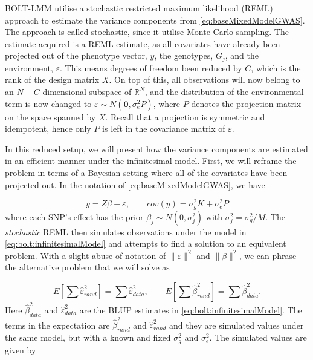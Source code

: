 BOLT-LMM utilise a stochastic restricted maximum likelihood (REML) approach to estimate the variance components from 
\cref{eq:baseMixedModelGWAS}. The approach is called stochastic, since it utilise Monte Carlo sampling. The estimate acquired is a 
REML estimate, as all covariates have already been projected out of the phenotype vector, $ y $, the genotypes, $ G_j $, and the 
environment, $ \varepsilon $. This means degrees of freedom been reduced by $ C $, which is the rank of the design matrix $ X $. On 
top of this, all observations will now belong to an $ N-C $ dimensional subspace of $ \mathbb{R}^{N} $, and the distribution of the 
environmental term is now changed to $ \varepsilon \sim N(\mathbf{0}, \sigma_e^2 P)$, where $ P $ denotes the projection matrix on the 
space spanned by $ X $. Recall that a projection is symmetric and idempotent, hence only $ P $ is left in the covariance matrix of $ 
\varepsilon $. 

In this reduced setup, we will present how the variance components are estimated in an efficient manner under the infinitesimal model. 
First, we will reframe the problem in terms of a Bayesian setting where all of the covariates have been projected out. In the notation 
of \cref{eq:baseMixedModelGWAS}, we have

\begin{equation}\label{eq:bolt:infinitesimalModel}
y = Z\beta + \varepsilon, \qquad cov(y) = \sigma_g^2 K + \sigma_e^2 P
\end{equation}
where each SNP's effect has the prior $ \beta_j \sim N(0, \sigma_j^2)$ with $\sigma_j^2 = \sigma_g^2 / M $. The \textit{stochastic} 
REML then simulates observations under the model in \cref{eq:bolt:infinitesimalModel} and attempts to find a solution to an 
equivalent problem. With a slight abuse of notation of $ \lVert \varepsilon \rVert^2$ and  $ \lVert \beta \rVert^2$, we can phrase the 
alternative problem that we will solve as

\begin{equation} \label{eq:bolt:AlternativeMMEProblem}
E\left[ \sum \hat{\varepsilon}^2_{rand} \right] = \sum \hat{\varepsilon}^2_{data}, \qquad E\left[ \sum \hat{\beta}^2_{rand} \right] = 
\sum \hat{\beta}^2_{data}.
\end{equation}
Here $ \hat{\beta}^2_{data} $ and $ \hat{\varepsilon}^2_{data} $ are the BLUP estimates in \cref{eq:bolt:infinitesimalModel}. The 
terms in the expectation are $ \hat{\beta}^2_{rand} $ and $ \hat{\varepsilon}^2_{rand} $ and they are simulated values under the same 
model, but with a known and fixed $ \sigma_g^2 $ and $ \sigma_e^2 $. The simulated values are given by

